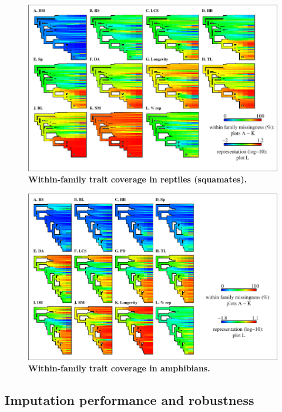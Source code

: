 \pagebreak

\begin{figure}[h!]
\centering
\includegraphics[scale=1]{figures/chapter2/NA_phylo_patterns/Reptiles_coverage}
\caption[Within-family trait coverage in reptiles (squamates)]{\textbf{Within-family trait coverage in reptiles (squamates).}}
\label{familycov_reptiles}
\end{figure}

\begin{figure}[h!]
\centering
\includegraphics[scale=1]{figures/chapter2/NA_phylo_patterns/Amphibians_coverage}
\caption[Within-family trait coverage in amphibians]{\textbf{Within-family trait coverage in amphibians.}}
\label{familycov_amphibians}
\end{figure}



\pagebreak
\subsection{Imputation performance and robustness}

